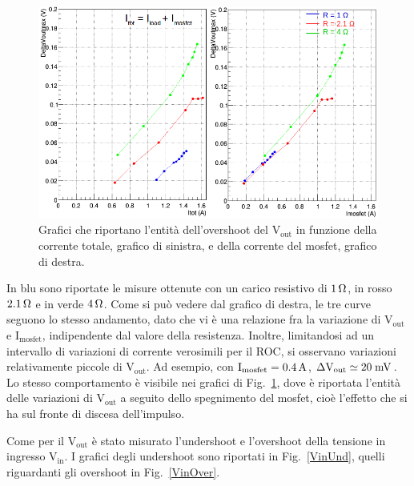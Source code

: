 \begin{figure}
\centering
\includegraphics[width=0.9\linewidth]{Immagini/VoutOver}
\caption{Grafici che riportano l'entità dell'overshoot del $\mathrm{V_{out}}$ in funzione della corrente totale, grafico di sinistra, e della corrente del mosfet, grafico di destra.}
\label{VoutOver}
\end{figure}
In blu sono riportate le misure ottenute con un carico resistivo di $1 {\rm \, \Omega}$, in rosso $2.1 {\rm \, \Omega}$  e in verde $4 {\rm \, \Omega}$.
Come si può vedere dal grafico di destra, le tre curve seguono lo stesso andamento, dato che vi è una relazione fra la variazione di $\mathrm{V_{out}}$ e $\mathrm{I_{mosfet}}$, indipendente dal valore della resistenza.
Inoltre, limitandosi ad un intervallo di variazioni di corrente verosimili per il ROC, si osservano variazioni relativamente piccole di $\mathrm{V_{out}}$.
Ad esempio, con $\mathrm{I_{mosfet}= 0.4 \rm \, A}$, $\mathrm{\Delta V_{out} \simeq 20\rm \; mV}$.
Lo stesso comportamento è visibile nei grafici di Fig.~\ref{VoutOver}, dove è riportata l'entità delle variazioni di $\mathrm{V_{out}}$ a seguito dello spegnimento del mosfet, cioè l'effetto che si ha sul fronte di discesa dell'impulso. 

Come per il $\mathrm{V_{out}}$ è stato misurato l'undershoot e l'overshoot della tensione in ingresso $\mathrm{V_{in}}$. I grafici degli undershoot sono riportati in Fig.~\ref{VinUnd}, quelli riguardanti gli overshoot in Fig.~\ref{VinOver}. 


